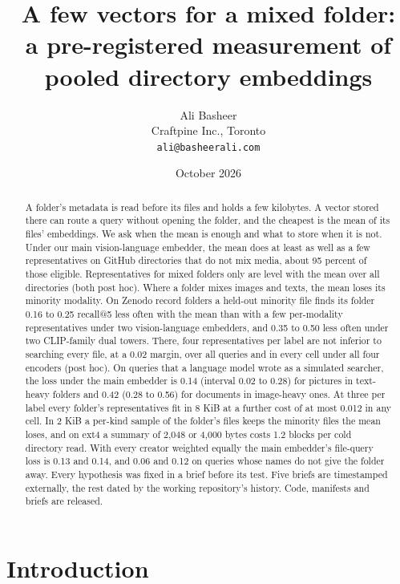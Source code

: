 \documentclass[11pt]{article}
\title{A few vectors for a mixed folder:\\a pre-registered measurement of pooled directory embeddings}
\author{Ali Basheer\\Craftpine Inc., Toronto\\\texttt{ali@basheerali.com}}
\date{October 2026}
\begin{document}
\maketitle

\begin{abstract}
A folder's metadata is read before its files and holds a few kilobytes. A vector stored there can route a query without opening the folder, and the cheapest is the mean of its files' embeddings. We ask when the mean is enough and what to store when it is not. Under our main vision-language embedder, the mean does at least as well as a few representatives on GitHub directories that do not mix media, about 95 percent of those eligible. Representatives for mixed folders only are level with the mean over all directories (both post hoc). Where a folder mixes images and texts, the mean loses its minority modality. On Zenodo record folders a held-out minority file finds its folder 0.16 to 0.25 recall@5 less often with the mean than with a few per-modality representatives under two vision-language embedders, and 0.35 to 0.50 less often under two CLIP-family dual towers. There, four representatives per label are not inferior to searching every file, at a 0.02 margin, over all queries and in every cell under all four encoders (post hoc). On queries that a language model wrote as a simulated searcher, the loss under the main embedder is 0.14 (interval 0.02 to 0.28) for pictures in text-heavy folders and 0.42 (0.28 to 0.56) for documents in image-heavy ones. At three per label every folder's representatives fit in 8 KiB at a further cost of at most 0.012 in any cell. In 2 KiB a per-kind sample of the folder's files keeps the minority files the mean loses, and on ext4 a summary of 2,048 or 4,000 bytes costs 1.2 blocks per cold directory read. With every creator weighted equally the main embedder's file-query loss is 0.13 and 0.14, and 0.06 and 0.12 on queries whose names do not give the folder away. Every hypothesis was fixed in a brief before its test. Five briefs are timestamped externally, the rest dated by the working repository's history. Code, manifests and briefs are released.
\end{abstract}

\section{Introduction}
\end{document}
